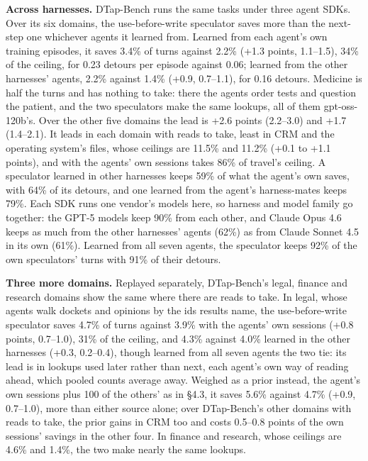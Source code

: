 \documentclass[10pt,twocolumn,letterpaper]{article}
\newcommand{\runin}[1]{{\sffamily\bfseries\color{accent}#1}}
\begin{document}
\runin{Across harnesses.} DTap-Bench runs the same tasks under three agent SDKs. Over its six domains, the use-before-write speculator saves more than the next-step one whichever agents it learned from. Learned from each agent's own training episodes, it saves 3.4\% of turns against 2.2\% (+1.3 points, 1.1--1.5), 34\% of the ceiling, for 0.23 detours per episode against 0.06; learned from the other harnesses' agents, 2.2\% against 1.4\% (+0.9, 0.7--1.1), for 0.16 detours. Medicine is half the turns and has nothing to take: there the agents order tests and question the patient, and the two speculators make the same lookups, all of them gpt-oss-120b's. Over the other five domains the lead is +2.6 points (2.2--3.0) and +1.7 (1.4--2.1). It leads in each domain with reads to take, least in CRM and the operating system's files, whose ceilings are 11.5\% and 11.2\% (+0.1 to +1.1 points), and with the agents' own sessions takes 86\% of travel's ceiling. A speculator learned in other harnesses keeps 59\% of what the agent's own saves, with 64\% of its detours, and one learned from the agent's harness-mates keeps 79\%. Each SDK runs one vendor's models here, so harness and model family go together: the GPT-5 models keep 90\% from each other, and Claude Opus 4.6 keeps as much from the other harnesses' agents (62\%) as from Claude Sonnet 4.5 in its own (61\%). Learned from all seven agents, the speculator keeps 92\% of the own speculators' turns with 91\% of their detours.

\runin{Three more domains.} Replayed separately, DTap-Bench's legal, finance and research domains show the same where there are reads to take. In legal, whose agents walk dockets and opinions by the ids results name, the use-before-write speculator saves 4.7\% of turns against 3.9\% with the agents' own sessions (+0.8 points, 0.7--1.0), 31\% of the ceiling, and 4.3\% against 4.0\% learned in the other harnesses (+0.3, 0.2--0.4), though learned from all seven agents the two tie: its lead is in lookups used later rather than next, each agent's own way of reading ahead, which pooled counts average away. Weighed as a prior instead, the agent's own sessions plus 100 of the others' as in §4.3, it saves 5.6\% against 4.7\% (+0.9, 0.7--1.0), more than either source alone; over DTap-Bench's other domains with reads to take, the prior gains in CRM too and costs 0.5--0.8 points of the own sessions' savings in the other four. In finance and research, whose ceilings are 4.6\% and 1.4\%, the two make nearly the same lookups.
\end{document}
